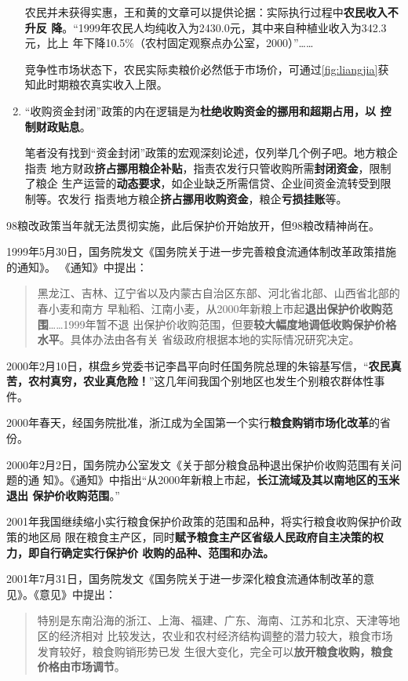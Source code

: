 \begin{enumerate}
  农民并未获得实惠，王和黄的文章可以提供论据：实际执行过程中\textbf{农民收入不升反
    降}。“1999年农民人均纯收入为2430.0元，其中来自种植业收入为342.3元，比上
  年下降10.5\%（农村固定观察点办公室，2000）”……

  竞争性市场状态下，农民实际卖粮价必然低于市场价，可通过\cref{fig:liangjia}获
  知此时期粮农真实收入上限。

\item “收购资金封闭”政策的内在逻辑是为\textbf{杜绝收购资金的挪用和超期占用，以
    控制财政贴息}。

  笔者没有找到“资金封闭”政策的宏观深刻论述，仅列举几个例子吧。地方粮企指责
  地方财政\textbf{挤占挪用粮企补贴}，指责农发行只管收购所需\textbf{封闭资金}，限制了粮企
  生产运营的\textbf{动态要求}，如企业缺乏所需信贷、企业间资金流转受到限制等。农发行
  指责地方粮企\textbf{挤占挪用收购资金}，粮企\textbf{亏损挂账}等。

\end{enumerate}

98粮改政策当年就无法贯彻实施，此后保护价开始放开，但98粮改精神尚在。

1999年5月30日，国务院发文《国务院关于进一步完善粮食流通体制改革政策措施的通知》。
《通知》中提出：
\begin{quotation}
  黑龙江、吉林、辽宁省以及内蒙古自治区东部、河北省北部、山西省北部的春小麦和南方
  早籼稻、江南小麦，从2000年新粮上市起\textbf{退出保护价收购范围}……1999年暂不退
  出保护价收购范围，但要\textbf{较大幅度地调低收购保护价格水平}。具体办法由各有关
  省级政府根据本地的实际情况研究决定。
\end{quotation}

2000年2月10日，棋盘乡党委书记李昌平向时任国务院总理的朱镕基写信，“\textbf{农民真
  苦，农村真穷，农业真危险！}”这几年间我国个别地区也发生个别粮农群体性事件。

2000年春天，经国务院批准，浙江成为全国第一个实行\textbf{粮食购销市场化改革}的省
份。

2000年2月2日，国务院办公室发文《关于部分粮食品种退出保护价收购范围有关问题的通
知》。《通知》中指出“从2000年新粮上市起，\textbf{长江流域及其以南地区的玉米退出
  保护价收购范围}。”

2001年我国继续缩小实行粮食保护价政策的范围和品种，将实行粮食收购保护价政策的地区局
限在粮食主产区，同时\textbf{赋予粮食主产区省级人民政府自主决策的权力，即自行确定实行保护价
  收购的品种、范围和办法。}

2001年7月31日，国务院发文《国务院关于进一步深化粮食流通体制改革的意
见》。《意见》中提出：
\begin{quotation}
  特别是东南沿海的浙江、上海、福建、广东、海南、江苏和北京、天津等地区的经济相对
  比较发达，农业和农村经济结构调整的潜力较大，粮食市场发育较好，粮食购销形势已发
  生很大变化，完全可以\textbf{放开粮食收购，粮食价格由市场调节}。
\end{quotation}


